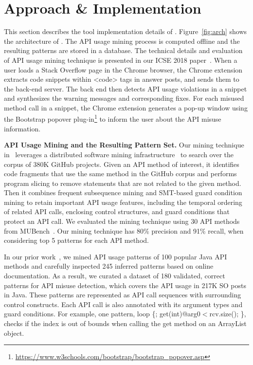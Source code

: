 \section{Approach \& Implementation}
\label{sec:implementation}

This section describes the tool implementation details of {\tool}. Figure~\ref{fig:arch} shows the architecture of {\tool}. 
The API usage mining process is computed offline and the resulting patterns are stored in a database. The technical details and evaluation of API usage mining technique is presented in our ICSE 2018 paper~\cite{zhang2018code}. When a user loads a Stack Overflow page in the Chrome browser, the Chrome extension extracts code snippets within {\ttt <code>} tags in answer posts, and sends them to the back-end server. The back end then detects API usage violations in a snippet and synthesizes the warning messages and corresponding fixes. For each misused method call in a snippet, the Chrome extension generates a pop-up window using the Bootstrap popover plug-in\footnote{\url{https://www.w3schools.com/bootstrap/bootstrap_popover.asp}} to inform the user about the API misuse information.

{\bf API Usage Mining and the Resulting Pattern Set.} Our mining technique in~\cite{zhang2018code} leverages a distributed software mining infrastructure~\cite{dyer2013boa} to search over the corpus of 380K GitHub projects. Given an API method of interest, it identifies code fragments that use the same method in the GitHub corpus and performs program slicing to remove statements that are not related to the given method. Then it combines frequent subsequence mining and SMT-based guard condition mining to retain important API usage features, including the temporal
ordering of related API calls, enclosing control structures, and guard conditions that protect an API call. We evaluated the mining technique using 30 API methods from MUBench~\cite{amani2016mubench}. Our mining technique has 80\% precision and 91\% recall, when considering top 5 patterns for each API method.

In our prior work~\cite{zhang2018code}, we mined API usage patterns of 100 popular Java API methods and carefully inspected 245 inferred patterns based on online documentation. As a result, we curated a dataset of 180 validated, correct patterns for API misuse detection, which covers the API usage in 217K SO posts in Java. These patterns are represented as API call sequences with surrounding control constructs. Each API call is also annotated with its argument types and guard conditions. For example, one pattern, {\ttt loop \{; get(int)@arg0$<$rcv.size(); \}}, checks if the index is out of bounds when calling the {\ttt get} method on an {\ttt ArrayList} object. %

